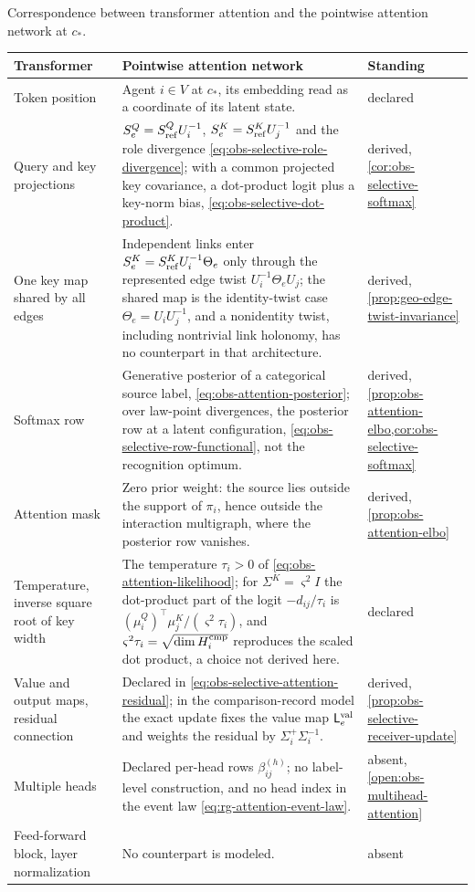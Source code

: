 \begin{sciencetable}{Correspondence between transformer attention and the pointwise attention network at $c_*$.}
\label{tab:obs-transformer-correspondence}
\begin{tabularx}{\textwidth}{>{\raggedright\arraybackslash}p{}>{\raggedright\arraybackslash}X>{\raggedright\arraybackslash}p{}}
\toprule
\textbf{Transformer} & \textbf{Pointwise attention network} & \textbf{Standing} \\
\midrule
Token position & Agent $i\in V$ at $c_*$, its embedding read as a coordinate of its latent state. & declared \\
Query and key projections & $S^Q_e=S^Q_{\rm ref}U_i^{-1}$, $S^K_e=S^K_{\rm ref}U_j^{-1}$ and the role divergence \eqref{eq:obs-selective-role-divergence}; with a common projected key covariance, a dot-product logit plus a key-norm bias, \eqref{eq:obs-selective-dot-product}. & derived, \cref{cor:obs-selective-softmax} \\
One key map shared by all edges & Independent links enter $S^K_e=S^K_{\rm ref}U_i^{-1}\Theta_e$ only through the represented edge twist $U_i^{-1}\Theta_eU_j$; the shared map is the identity-twist case $\Theta_e=U_iU_j^{-1}$, and a nonidentity twist, including nontrivial link holonomy, has no counterpart in that architecture. & derived, \cref{prop:geo-edge-twist-invariance} \\
Softmax row & Generative posterior of a categorical source label, \eqref{eq:obs-attention-posterior}; over law-point divergences, the posterior row at a latent configuration, \eqref{eq:obs-selective-row-functional}, not the recognition optimum. & derived, \cref{prop:obs-attention-elbo,cor:obs-selective-softmax} \\
Attention mask & Zero prior weight: the source lies outside the support of $\pi_i$, hence outside the interaction multigraph, where the posterior row vanishes. & derived, \cref{prop:obs-attention-elbo} \\
Temperature, inverse square root of key width & The temperature $\tau_i>0$ of \eqref{eq:obs-attention-likelihood}; for $\Sigma^K=\varsigma^2I$ the dot-product part of the logit $-d_{ij}/\tau_i$ is $(\mu_i^Q)^\top\mu_j^K/(\varsigma^2\tau_i)$, and $\varsigma^2\tau_i=\sqrt{\dim H^{\rm cmp}_i}$ reproduces the scaled dot product, a choice not derived here. & declared \\
Value and output maps, residual connection & Declared in \eqref{eq:obs-selective-attention-residual}; in the comparison-record model the exact update fixes the value map $\mathsf L_e^{\rm val}$ and weights the residual by $\Sigma_i^+\Sigma_i^{-1}$. & derived, \cref{prop:obs-selective-receiver-update} \\
Multiple heads & Declared per-head rows $\beta_{ij}^{(h)}$; no label-level construction, and no head index in the event law \eqref{eq:rg-attention-event-law}. & absent, \cref{open:obs-multihead-attention} \\
Feed-forward block, layer normalization & No counterpart is modeled. & absent \\
\bottomrule
\end{tabularx}
\end{sciencetable}

